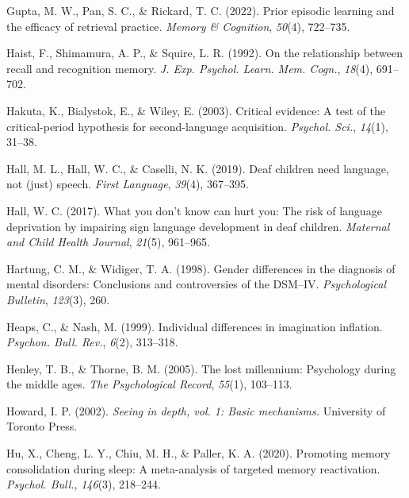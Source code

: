 \documentclass[
]{krantz}
\newlength{\cslhangindent}
\newlength{\cslentryspacingunit} %
\newenvironment{CSLReferences}[2] %
 {%
  \setlength{\parindent}{0pt}
  \ifodd #1
  \let\oldpar\par
  \def\par{\hangindent=\cslhangindent\oldpar}
  \fi
  \setlength{\parskip}{#2\cslentryspacingunit}
 }%
 {}
\begin{document}
\begin{CSLReferences}{1}{0}
\leavevmode{}%
Gupta, M. W., Pan, S. C., \& Rickard, T. C. (2022). Prior episodic learning and the efficacy of retrieval practice. \emph{Memory \& Cognition}, \emph{50}(4), 722--735.

\leavevmode{}%
Haist, F., Shimamura, A. P., \& Squire, L. R. (1992). On the relationship between recall and recognition memory. \emph{J. Exp. Psychol. Learn. Mem. Cogn.}, \emph{18}(4), 691--702.

\leavevmode{}%
Hakuta, K., Bialystok, E., \& Wiley, E. (2003). Critical evidence: A test of the critical-period hypothesis for second-language acquisition. \emph{Psychol. Sci.}, \emph{14}(1), 31--38.

\leavevmode{}%
Hall, M. L., Hall, W. C., \& Caselli, N. K. (2019). Deaf children need language, not (just) speech. \emph{First Language}, \emph{39}(4), 367--395.

\leavevmode{}%
Hall, W. C. (2017). What you don't know can hurt you: The risk of language deprivation by impairing sign language development in deaf children. \emph{Maternal and Child Health Journal}, \emph{21}(5), 961--965.

\leavevmode{}%
Hartung, C. M., \& Widiger, T. A. (1998). Gender differences in the diagnosis of mental disorders: Conclusions and controversies of the DSM--IV. \emph{Psychological Bulletin}, \emph{123}(3), 260.

\leavevmode{}%
Heaps, C., \& Nash, M. (1999). Individual differences in imagination inflation. \emph{Psychon. Bull. Rev.}, \emph{6}(2), 313--318.

\leavevmode{}%
Henley, T. B., \& Thorne, B. M. (2005). The lost millennium: Psychology during the middle ages. \emph{The Psychological Record}, \emph{55}(1), 103--113.

\leavevmode{}%
Howard, I. P. (2002). \emph{Seeing in depth, vol. 1: Basic mechanisms.} University of Toronto Press.

\leavevmode{}%
Hu, X., Cheng, L. Y., Chiu, M. H., \& Paller, K. A. (2020). Promoting memory consolidation during sleep: A meta-analysis of targeted memory reactivation. \emph{Psychol. Bull.}, \emph{146}(3), 218--244.


\end{CSLReferences}
\end{document}
